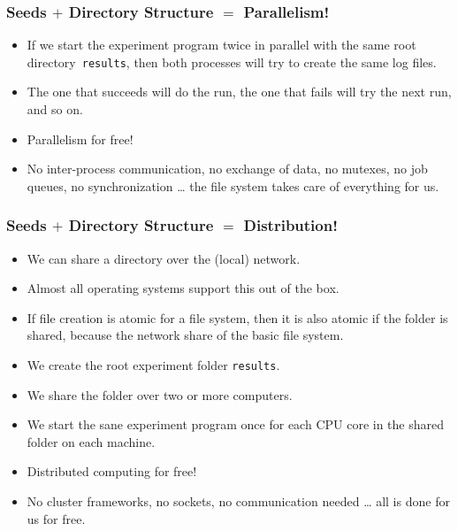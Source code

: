 \documentclass[aspectratio=169,mathserif,notheorems]{beamer}%
\begin{document}
%
\begin{frame}%
\frametitle{Seeds $+$ Directory Structure $=$ Parallelism!}%
\begin{itemize}%
\item If we start the experiment program twice in parallel with the same root directory~\texttt{results}, then both processes will try to create the same log files.%
%
\item<2-> The one that succeeds will do the run, the one that fails will try the next run, and so on.%
%
\item<3-> Parallelism for free!%
%
\item<4-> No inter-process communication, no exchange of data, no mutexes, no job queues, no synchronization {\dots} the file system takes care of everything for us.%
%
\end{itemize}%
\end{frame}%
%
\begin{frame}%
\frametitle{Seeds $+$ Directory Structure $=$ Distribution!}%
\begin{itemize}%
\item We can share a directory over the (local) network.%
%
\item<2-> Almost all operating systems support this out of the box.%
%
\item<4-> If file creation is atomic for a file system, then it is also atomic if the folder is shared, because the network share  of the basic file system.%
%
\item<5-> We create the root experiment folder \texttt{results}.%
%
\item<6-> We share the folder over two or more computers.%
%
\item<7-> We start the sane experiment program once for each CPU core in the shared folder on each machine.%
%
\item<8-> Distributed computing for free!%
%
\item<9-> No cluster frameworks, no sockets, no communication needed {\dots} all is done for us for free.%
%
\end{itemize}%
\end{frame}%
%
\end{document}

